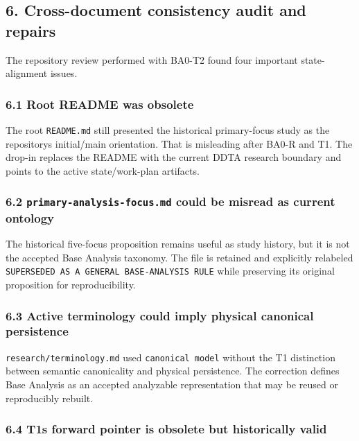 \documentclass[
  10pt,
  a4paper,
]{article}
\begin{document}
\subsection{6. Cross-document consistency audit and
repairs}\label{6-cross-document-consistency-audit-and-repairs}

The repository review performed with BA0-T2 found four important
state-alignment issues.

\subsubsection{6.1 Root README was
obsolete}\label{61-root-readme-was-obsolete}

The root \texttt{README.md} still presented the historical primary-focus
study as the repository\textquotesingle s initial/main orientation. That
is misleading after BA0-R and T1. The drop-in replaces the README with
the current DDTA research boundary and points to the active
state/work-plan artifacts.

\subsubsection{\texorpdfstring{6.2 \texttt{primary-analysis-focus.md}
could be misread as current
ontology}{6.2 primary-analysis-focus.md could be misread as current ontology}}\label{62-primary-analysis-focusmd-could-be-misread-as-current-ontology}

The historical five-focus proposition remains useful as study history,
but it is not the accepted Base Analysis taxonomy. The file is retained
and explicitly relabeled
\texttt{SUPERSEDED\ AS\ A\ GENERAL\ BASE-ANALYSIS\ RULE} while
preserving its original proposition for reproducibility.

\subsubsection{6.3 Active terminology could imply physical canonical
persistence}\label{63-active-terminology-could-imply-physical-canonical-persistence}

\texttt{research/terminology.md} used \texttt{canonical\ model} without
the T1 distinction between semantic canonicality and physical
persistence. The correction defines Base Analysis as an accepted
analyzable representation that may be reused or reproducibly rebuilt.

\subsubsection{6.4 T1\textquotesingle s forward pointer is obsolete but
historically
valid}\label{64-t1s-forward-pointer-is-obsolete-but-historically-valid}
\end{document}
